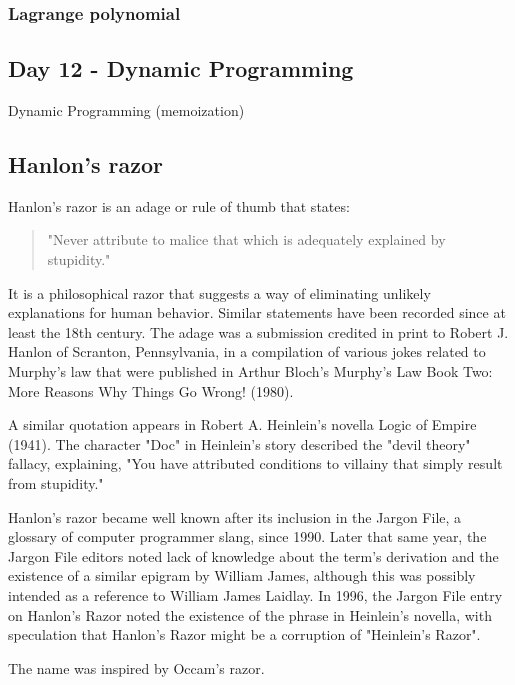 \documentclass[]{scrartcl}
\begin{document}
\subsubsection{Lagrange polynomial}

\subsection{Day 12 - Dynamic Programming}
Dynamic Programming (memoization)

\subsection{Hanlon's razor}

Hanlon's razor is an adage or rule of thumb that states:

\vspace*{\fill} 
\begin{quote} 
	\centering 
	"Never attribute to malice that which is adequately explained by stupidity."
\end{quote}
\vspace*{\fill}

It is a philosophical razor that suggests a way of eliminating unlikely explanations for human behavior. Similar statements have been recorded since at least the 18th century. The adage was a submission credited in print to Robert J. Hanlon of Scranton, Pennsylvania, in a compilation of various jokes related to Murphy's law that were published in Arthur Bloch's Murphy's Law Book Two: More Reasons Why Things Go Wrong! (1980).

A similar quotation appears in Robert A. Heinlein's novella Logic of Empire (1941). The character "Doc" in Heinlein's story described the "devil theory" fallacy, explaining, "You have attributed conditions to villainy that simply result from stupidity."

Hanlon's razor became well known after its inclusion in the Jargon File, a glossary of computer programmer slang, since 1990. Later that same year, the Jargon File editors noted lack of knowledge about the term's derivation and the existence of a similar epigram by William James, although this was possibly intended as a reference to William James Laidlay. In 1996, the Jargon File entry on Hanlon's Razor noted the existence of the phrase in Heinlein's novella, with speculation that Hanlon's Razor might be a corruption of "Heinlein's Razor". 

The name was inspired by Occam's razor.
\end{document}
